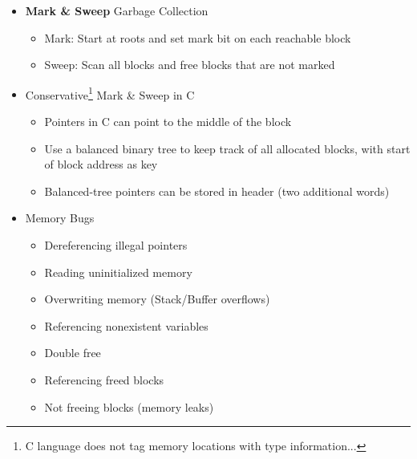 \documentclass[12pt]{article}
\begin{document}
{\begin{itemize}
\begin{itemize}
	\end{itemize}
	\item \textbf{Mark \& Sweep} Garbage Collection
	\begin{itemize}
		\item Mark: Start at roots and set mark bit on each reachable block
		\item Sweep: Scan all blocks and free blocks that are not marked
	\end{itemize}
	\item Conservative\footnote{C language does not tag memory locations with type information...} Mark \& Sweep in C
	\begin{itemize}
		\item Pointers in C can point to the middle of the block
		\item Use a balanced binary tree to keep track of all allocated blocks, with start of block address as key
		\item Balanced-tree pointers can be stored in header (two additional words) 
	\end{itemize}
	\item Memory Bugs
	\begin{itemize}
		\item Dereferencing illegal pointers
		\item Reading uninitialized memory
		\item Overwriting memory (Stack/Buffer overflows)
		\item Referencing nonexistent variables
		\item Double free
		\item Referencing freed blocks
		\item Not freeing blocks (memory leaks)
	\end{itemize}
\end{itemize}

\pagebreak

}
\end{document}
